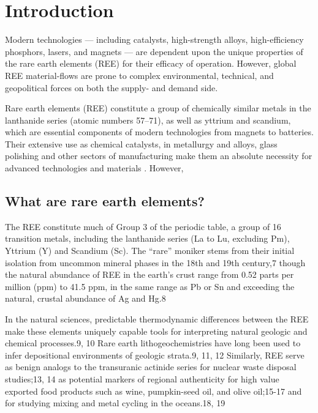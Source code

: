 \chapter{Introduction}
\vspace{-1cm}

Modern technologies --- including catalysts, high-strength alloys, high-efficiency phosphors, lasers, and magnets --- are dependent upon the unique properties of the rare earth elements (REE) for their efficacy of operation.
However, global REE material-flows are prone to complex environmental, technical, and geopolitical forces on both the supply- and demand side.


Rare earth elements (REE) constitute a group of chemically similar metals in the lanthanide series (atomic numbers 57--71), as well as yttrium and scandium, which are essential components of modern technologies from magnets to batteries.
Their extensive use as chemical catalysts, in metallurgy and alloys, glass polishing and other sectors of manufacturing make them an absolute necessity for advanced technologies and materials \citep{USGS_commsumm}.
However, 


\section{What are rare earth elements?}
The REE constitute much of Group 3 of the periodic table, a group of 16 transition metals, including the lanthanide series (La to Lu, excluding Pm), Yttrium (Y) and Scandium (Sc).
The ``rare'' moniker stems from their initial isolation from uncommon mineral phases in the 18th and 19th century,7
though the natural abundance of REE in the earth's crust range from 0.52 parts per million (ppm) to 41.5 ppm, in the same range as Pb or Sn and exceeding the natural, crustal abundance of Ag and Hg.8

In the natural sciences, predictable thermodynamic differences between the REE make these elements uniquely capable tools for interpreting natural geologic and chemical processes.9, 10
Rare earth lithogeochemistries have long been used to infer depositional environments of geologic strata.9, 11, 12
Similarly, REE serve as benign analogs to the transuranic actinide series for nuclear waste disposal studies;13, 14
as potential markers of regional authenticity for high value exported food products such as wine, pumpkin-seed oil, and olive oil;15-17
and for studying mixing and metal cycling in the oceans.18, 19

